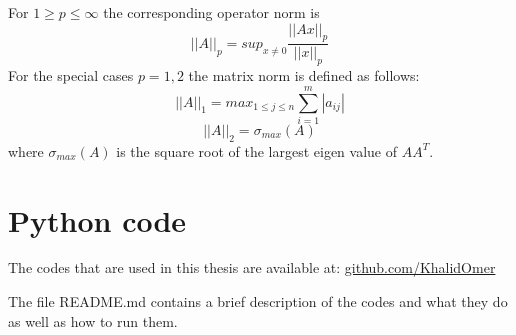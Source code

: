 For $ 1 \geq p \leq \infty$ the corresponding operator norm is \begin{equation} ||A||_p = sup_{x \neq 0} \frac{||Ax||_p}{||x||_p} \end{equation} 
For the special cases $ p = 1,2$ the matrix norm is defined as follows: \begin{equation}
||A||_1 = max_{1\leq j \leq n} \sum_{i =1}^{m} |a_{ij} |
\end{equation}
\begin{equation}
||A||_2 = \sigma_{max} (A) 
\end{equation} where $\sigma_{max} (A)$ is the square root of the largest eigen value of $ AA^{T} $.

\section{Python code}

The codes that are used in this thesis are available at: \href{https://github.com/KhalidOmer/School_thesis/tree/main}{github.com/KhalidOmer}


The file README.md contains a brief description of the codes and what they do as well as how to
run them.



